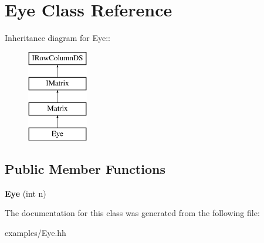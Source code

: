 \hypertarget{classEye}{
\section{Eye Class Reference}
\label{classEye}
}
Inheritance diagram for Eye::\begin{figure}[H]
\begin{center}
\leavevmode
\includegraphics[height=4cm]{classEye}
\end{center}
\end{figure}
\subsection*{Public Member Functions}
\begin{DoxyCompactItemize}
\item 
\hypertarget{classEye_a30767316add2197e9f37971f0193d64a}{
{\bfseries Eye} (int n)}
\label{classEye_a30767316add2197e9f37971f0193d64a}

\end{DoxyCompactItemize}


The documentation for this class was generated from the following file:\begin{DoxyCompactItemize}
\item 
examples/Eye.hh\end{DoxyCompactItemize}
